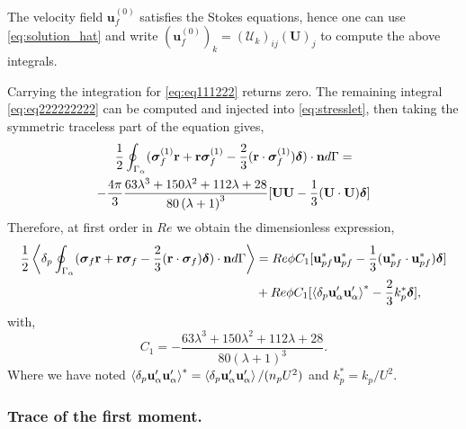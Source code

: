 The velocity field $\textbf{u}_f^{(0)}$ satisfies the Stokes equations, hence one can use \ref{eq:solution_hat} and write $(\textbf{u}_f^{(0)})_k = (\mathcal{U}_k)_{ij}(\textbf{U})_j$ to compute the above integrals. 

Carrying the integration for  \ref{eq:eq111222} returns zero. 
The remaining integral \eqref{eq:eq222222222} can be computed and injected into \ref{eq:stresslet}, then taking the symmetric traceless part of the equation gives, 
\begin{multline}
    \frac{1}{2}\oint_{\Gamma_{\alpha}} (\bm\sigma_f^{(1)} \textbf{r} + \textbf{r} \bm\sigma_f^{(1)} -\frac{2}{3}(\textbf{r} \cdot \bm\sigma_f^{(1)} )\bm\delta)\cdot \textbf{n} d\Gamma
    = \\
    - \frac{4\pi}{3}\frac{63 \lambda^{3} + 150 \lambda^{2} + 112 \lambda + 28}{80 \left(\lambda + 1\right)^{3}}
    [
        \textbf{UU} - \frac{1}{3}(\textbf{U}\cdot \textbf{U})\bm\delta 
    ]
\end{multline}
Therefore, at first order in $Re$ we obtain the dimensionless expression, 
\begin{align}
    \frac{1}{2}\pSavg{ (\bm\sigma_f \textbf{r} + \textbf{r} \bm\sigma_f -\frac{2}{3}(\textbf{r} \cdot \bm\sigma_f )\bm\delta) \cdot \textbf{n}}
    &= 
    Re \phi C_1
    [
        \textbf{u}_{pf}^*\textbf{u}_{pf}^* - \frac{1}{3}(\textbf{u}_{pf}^*\cdot \textbf{u}_{pf}^*)\bm\delta 
    ]\\
    &+ Re \phi  C_1 
    [
        \pavg{\textbf{u}_\alpha'\textbf{u}_\alpha'}^* - \frac{2}{3}k_p^*\bm\delta 
    ],\\
    \label{eq:sol1} 
\end{align}
with, 
\begin{equation}
    C_1 = - \frac{63 \lambda^{3} + 150 \lambda^{2} + 112 \lambda + 28}{80 \left(\lambda + 1\right)^{3}}. 
\end{equation}
Where we have noted $\left<\delta_p \textbf{u}_\alpha'\textbf{u}_\alpha'\right>^* = \left<\delta_p \textbf{u}_\alpha'\textbf{u}_\alpha'\right>/(n_p U^2)$ and $k_p^* = k_p/U^2$. 
 

\subsubsection{Trace of the first moment.}

